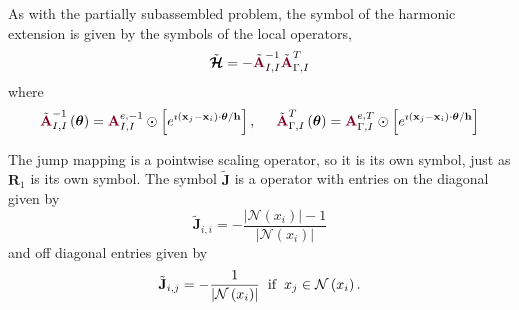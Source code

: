As with the partially subassembled problem, the symbol of the harmonic extension is given by the symbols of the local operators,
\begin{equation}
\tilde{\boldsymbol{\mathcal{H}}} = - \tilde{{\color{burgundy}\mathbf{A}}}_{I, I}^{-1} \tilde{{\color{burgundy}\mathbf{A}}}_{\Gamma, I}^T
\end{equation}
where
\begin{equation}
\tilde{{\color{burgundy}\mathbf{A}}}_{I, I}^{-1} \left( \boldsymbol{\theta} \right) = {\color{burgundy}\mathbf{A}}_{I, I}^{e, -1} \odot \left[ e^{\imath \left( \mathbf{x}_j - \mathbf{x}_i \right) \cdot \boldsymbol{\theta} / \mathbf{h}} \right],
\hspace{5mm}
\tilde{{\color{burgundy}\mathbf{A}}}_{\Gamma, I}^T \left( \boldsymbol{\theta} \right) = {\color{burgundy}\mathbf{A}}_{\Gamma, I}^{e, T} \odot \left[ e^{\imath \left( \mathbf{x}_j - \mathbf{x}_i \right) \cdot \boldsymbol{\theta} / \mathbf{h}} \right]
\end{equation}

The jump mapping is a pointwise scaling operator, so it is its own symbol, just as $\mathbf{R}_1$ is its own symbol.
The symbol $\tilde{\mathbf{J}}$ is a operator with entries on the diagonal given by
\begin{equation}
\tilde{\mathbf{J}}_{i, i} = - \frac{\lvert \mathcal{N} \left( x_i \right) \rvert - 1}{\lvert \mathcal{N} \left( x_i \right) \rvert}
\end{equation}
and off diagonal entries given by
\begin{equation}
\tilde{\mathbf{J}}_{i, j} = - \frac{1}{\lvert \mathcal{N} \left( x_i \right) \rvert} \hspace{2mm} \text{if} \hspace{2mm} x_j \in \mathcal{N} \left( x_i \right).
\end{equation}

